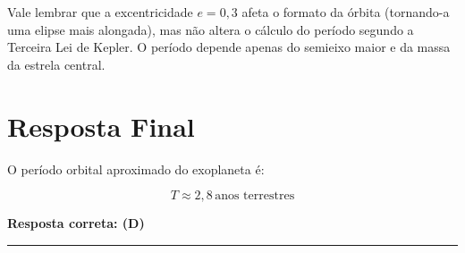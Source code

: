 \documentclass[a4paper,12pt]{article}
\begin{document}
\begin{flushleft}
Vale lembrar que a excentricidade \(e = 0{,}3\) afeta o formato da órbita (tornando-a uma elipse mais alongada), mas não altera 
o cálculo do período segundo a Terceira Lei de Kepler. O período depende apenas do semieixo maior e da massa da estrela central.

\section*{Resposta Final}

O período orbital aproximado do exoplaneta é:

\[
\boxed{T \approx 2{,}8\,\text{anos terrestres}}
\]

\textbf{Resposta correta: \colorbox{green!50}{(D)}}

\end{flushleft}

\noindent\rule{\linewidth}{0.6pt}\\
\end{document}
